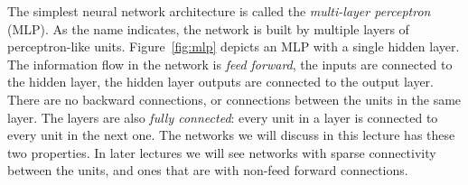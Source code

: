 \begin{marginfigure}
  \centering
  \xdef\layersep{17.5mm}
  \caption{\label{fig:mlp}%
    A multi-layer perceptron.
  }
\end{marginfigure}
The simplest neural network architecture is called
the \emph{multi-layer perceptron} (MLP).
As the name indicates,
the network is built by multiple layers of
perceptron-like units.
Figure~\ref{fig:mlp} depicts an MLP with a single hidden layer.
The information flow in the network is \emph{feed forward},
the inputs are connected to the hidden layer,
the hidden layer outputs are connected to the output layer.
There are no backward connections,
or connections between the units in the same layer.
The layers are also \emph{fully connected}:
every unit in a layer is connected to every unit in the next one.
The networks we will discuss in this lecture has these two properties.
In later lectures we will see networks with sparse connectivity
between the units, and ones that are with non-feed forward connections. 


